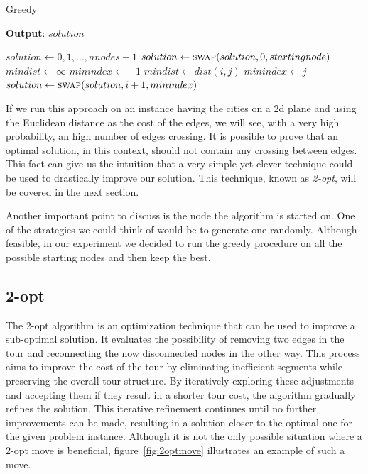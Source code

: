 \documentclass{article}
\begin{document}
\begin{algorithm}[ht]
\caption{Greedy}
\label{alg:greedy}
\hspace*{0.5em} \textbf{Output}: $solution$
\begin{algorithmic}
	\State $solution \gets {0, 1, \dots, nnodes - 1}$
	\State $solution \gets \Call{swap}{solution, 0, startingnode}$
                \State $mindist \gets \infty$
                \State $minindex \gets -1$
                                \State $mindist \gets dist(i, j)$
                                \State $minindex \gets j$
                        \EndIf
                \EndFor
                \State $solution \gets \Call{swap}{solution, i + 1, minindex}$
        \EndFor
\EndProcedure
\end{algorithmic}
\end{algorithm}
If we run this approach on an instance having the cities on a 2d plane and using the
Euclidean distance as the cost of the edges, we will see, with a very high probability, an
high number of edges crossing.
It is possible to prove that an optimal solution, in this context, should not contain any crossing
between edges.
This fact can give us the intuition that a very simple yet clever technique could be used
to drastically improve our solution. This technique, known as \textit{2-opt}, will be covered
in the next section.

Another important point to discuss is the node the algorithm is started on.
One of the strategies we could think of would be to generate one randomly.
Although feasible, in our experiment we decided to run the greedy procedure
on all the possible starting nodes and then keep the best.


\subsection{2-opt}
The 2-opt algorithm is an optimization technique that can be used to improve a sub-optimal solution.
It evaluates the possibility of removing two edges in the tour and reconnecting the now disconnected nodes in the other way.
This process aims to improve the cost of the tour by eliminating inefficient segments while preserving the overall tour structure. By
iteratively exploring these adjustments and accepting them if they result in a shorter tour cost, the algorithm gradually refines
the solution. This iterative refinement continues until no further improvements can be made, resulting in a
solution closer to the optimal one for the given problem instance.
Although it is not the only possible situation where a 2-opt move is
beneficial, figure~\ref{fig:2optmove} illustrates an example of such a move.
\end{document}
